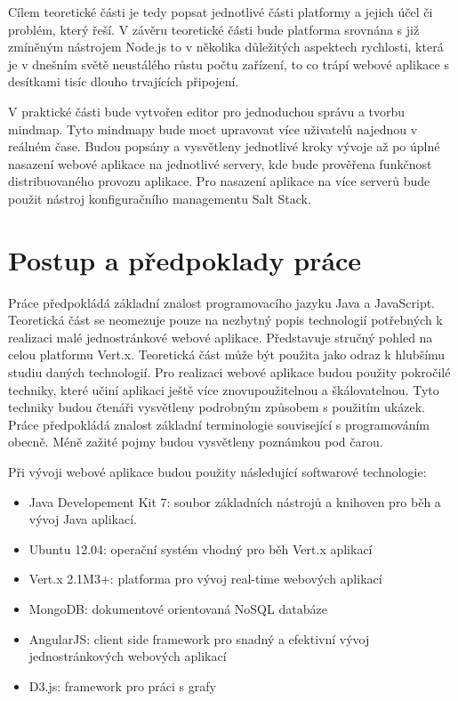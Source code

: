Cílem teoretické části je tedy popsat jednotlivé části platformy a jejich účel či problém, který řeší. V závěru teoretické části bude platforma srovnána s již zmíněným nástrojem Node.js to v několika důležitých aspektech rychlosti, která je v dnešním světě neustálého růstu počtu zařízení, to co trápí webové aplikace s desítkami tisíc dlouho trvajících připojení.

V praktické části bude vytvořen editor pro jednoduchou správu a tvorbu mindmap. Tyto mindmapy bude moct upravovat více uživatelů najednou v reálném čase. Budou popsány a vysvětleny jednotlivé kroky vývoje až po úplné nasazení webové aplikace na jednotlivé servery, kde bude prověřena funkčnost distribuovaného provozu aplikace. Pro nasazení aplikace na více serverů bude použit nástroj konfiguračního managementu Salt Stack.

\section{Postup a předpoklady práce}

Práce předpokládá základní znalost programovacího jazyku Java a JavaScript. Teoretická část se neomezuje pouze na nezbytný popis technologií potřebných k realizaci malé jednostránkové webové aplikace. Představuje stručný pohled na celou platformu Vert.x. Teoretická část může být použita jako odraz k hlubšímu studiu daných technologií. Pro realizaci webové aplikace budou použity pokročilé techniky, které učiní aplikaci ještě více znovupoužitelnou a škálovatelnou. Tyto techniky budou čtenáři vysvětleny podrobným způsobem s použitím ukázek. Práce předpokládá znalost základní terminologie související s programováním obecně. Méně zažité pojmy budou vysvětleny poznámkou pod čarou.

Při vývoji webové aplikace budou použity následující softwarové technologie:
\begin{itemize}
\item Java Developement Kit 7: soubor základních nástrojů a knihoven pro běh a vývoj Java aplikací.
\item Ubuntu 12.04: operační systém vhodný pro běh Vert.x aplikací
\item Vert.x 2.1M3+: platforma pro vývoj real-time webových aplikací
\item MongoDB: dokumentové orientovaná NoSQL databáze
\item AngularJS: client side framework pro snadný a efektivní vývoj jednostránkových webových aplikací
\item D3.js: framework pro práci s grafy
\end{itemize}